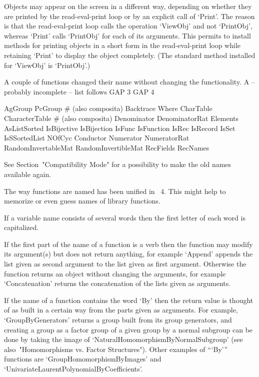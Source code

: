 Objects may appear on the screen in a different way,
depending on whether they are printed by the read-eval-print loop
or by an explicit call of `Print'.
The reason is that the read-eval-print loop calls the operation `ViewObj'
and not `PrintObj', whereas `Print' calls `PrintObj' for each of its
arguments.
This permits to  install methods for printing objects in a short form
in the read-eval-print loop while retaining `Print' to display
the object completely.
(The standard method installed for `ViewObj' is `PrintObj'.)



A couple of functions changed their name without changing the
functionality.
A -- probably incomplete -- list follows
\begintt
    GAP 3                   GAP 4

    AgGroup                 PcGroup            # (also composita)
    Backtrace               Where
    CharTable               CharacterTable     # (also composita)
    Denominator             DenominatorRat
    Elements                AsListSorted
    IsBijective             IsBijection
    IsFunc                  IsFunction
    IsRec                   IsRecord
    IsSet                   IsSSortedList
    NOfCyc                  Conductor
    Numerator               NumeratorRat
    RandomInvertableMat     RandomInvertibleMat
    RecFields               RecNames
\endtt

See Section~"Compatibility Mode" for a possibility to make the old names
available again.



The way functions are named has been unified in {\GAP}~4.
This might help to memorize or even guess names of library functions.

If a variable name consists of several words then the first
letter of each word is capitalized.

If the first part of the name of a function is a verb then the function
may modify its argument(s) but does not return anything,
for example `Append' appends the list given as second argument to the
list given as first argument.
Otherwise the function returns an object without changing the arguments,
for example `Concatenation' returns the concatenation of the lists
given as arguments.

If the name of a function contains the word `By' then the return value is
thought of as built in a certain way from the parts given as arguments.
For example, `GroupByGenerators' returns a group built from its group
generators, and creating a group as a factor group of a given group
by a normal subgroup can be done by taking the image of
`NaturalHomomorphismByNormalSubgroup'
(see also~"Homomorphisms vs. Factor Structures").
Other examples of ```By''' functions are `GroupHomomorphismByImages' and
`UnivariateLaurentPolynomialByCoefficients'.

